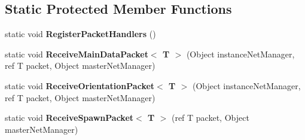 \subsection*{Static Protected Member Functions}
\begin{DoxyCompactItemize}
\item 
\hypertarget{class_s_e_mod_a_p_i_internal_1_1_a_p_i_1_1_entity_1_1_sector_1_1_sector_object_1_1_character_entity_network_manager_a97dfc1a6010ddd1e2882db467ed8961d}{}static void {\bfseries Register\+Packet\+Handlers} ()\label{class_s_e_mod_a_p_i_internal_1_1_a_p_i_1_1_entity_1_1_sector_1_1_sector_object_1_1_character_entity_network_manager_a97dfc1a6010ddd1e2882db467ed8961d}

\item 
\hypertarget{class_s_e_mod_a_p_i_internal_1_1_a_p_i_1_1_entity_1_1_sector_1_1_sector_object_1_1_character_entity_network_manager_a3c871b1f9e931c6d2ece5f7391312432}{}static void {\bfseries Receive\+Main\+Data\+Packet$<$ T $>$} (Object instance\+Net\+Manager, ref T packet, Object master\+Net\+Manager)\label{class_s_e_mod_a_p_i_internal_1_1_a_p_i_1_1_entity_1_1_sector_1_1_sector_object_1_1_character_entity_network_manager_a3c871b1f9e931c6d2ece5f7391312432}

\item 
\hypertarget{class_s_e_mod_a_p_i_internal_1_1_a_p_i_1_1_entity_1_1_sector_1_1_sector_object_1_1_character_entity_network_manager_a18b1680b94157fc65c12a4fa532f16c8}{}static void {\bfseries Receive\+Orientation\+Packet$<$ T $>$} (Object instance\+Net\+Manager, ref T packet, Object master\+Net\+Manager)\label{class_s_e_mod_a_p_i_internal_1_1_a_p_i_1_1_entity_1_1_sector_1_1_sector_object_1_1_character_entity_network_manager_a18b1680b94157fc65c12a4fa532f16c8}

\item 
\hypertarget{class_s_e_mod_a_p_i_internal_1_1_a_p_i_1_1_entity_1_1_sector_1_1_sector_object_1_1_character_entity_network_manager_a85b274f91efa93c20108669cc25ae5c0}{}static void {\bfseries Receive\+Spawn\+Packet$<$ T $>$} (ref T packet, Object master\+Net\+Manager)\label{class_s_e_mod_a_p_i_internal_1_1_a_p_i_1_1_entity_1_1_sector_1_1_sector_object_1_1_character_entity_network_manager_a85b274f91efa93c20108669cc25ae5c0}

\end{DoxyCompactItemize}
